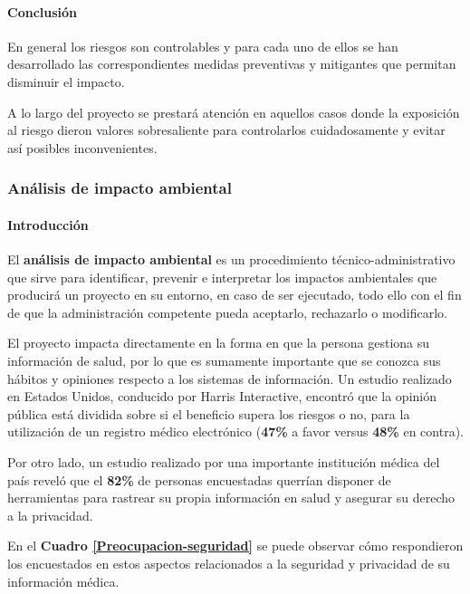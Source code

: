 \paragraph{Conclusión}

En general los riesgos son controlables y para cada uno de ellos se han desarrollado las correspondientes medidas preventivas y mitigantes que permitan  disminuir el impacto. 

A lo largo del proyecto se prestará atención en aquellos casos donde la exposición al riesgo dieron valores sobresaliente para controlarlos cuidadosamente y evitar así posibles inconvenientes.


\subsubsection{Análisis de impacto ambiental}


\paragraph{Introducción}
	El \textbf{análisis de impacto ambiental} es un procedimiento técnico-administrativo que sirve para identificar, prevenir e interpretar los impactos ambientales que producirá un proyecto en su entorno, en caso de ser ejecutado, todo ello con el fin de que la administración competente pueda aceptarlo, rechazarlo o modificarlo.
    
    El proyecto impacta directamente en la forma en que la persona gestiona su información de salud, por lo que es sumamente importante que se conozca sus hábitos y opiniones respecto a los sistemas de información.
    Un estudio realizado en Estados Unidos, conducido por Harris Interactive, encontró que la opinión pública está dividida sobre si el beneficio supera los riesgos o no, para la utilización de un registro médico electrónico (\textbf{47\%} a favor versus \textbf{48\%} en contra).
    
    Por otro lado, un estudio realizado por una importante institución médica del país reveló que el \textbf{82\%} de personas encuestadas querrían disponer de herramientas para rastrear su propia información en salud y asegurar su derecho a la privacidad.
    
    En el \textbf{Cuadro \ref{Preocupacion-seguridad}} se puede observar cómo respondieron los encuestados en estos aspectos relacionados a la seguridad y privacidad de su información médica.
    
